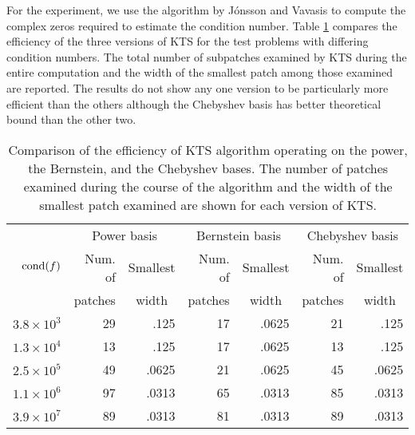 \documentclass[12pt]{article}
\begin{document}
For the experiment, we use the algorithm by J\'{o}nsson and
Vavasis \cite{jonsson} to compute the complex zeros required to
estimate the condition number. Table \ref{table_ba} compares the
efficiency of the three versions of KTS for the test problems
with differing condition numbers. The total number of subpatches
examined by KTS during the entire computation and the width of
the smallest patch among those examined are reported. The results
do not show any one version to be particularly more efficient than
the others although the Chebyshev basis has better theoretical
bound than the other two.
\begin{table}
\caption{Comparison of the efficiency of KTS algorithm
operating on the power, the Bernstein, and the Chebyshev bases.
The number of patches examined during the course of the algorithm
and the width of the smallest patch examined are shown for each
version of KTS. \label{table_ba} }
\begin{center}
\begin{tabular}{|r|r|r|r|r|r|r|}
\hline
 & \multicolumn{2}{c}{Power basis} \vline& \multicolumn{2}{c}{Bernstein basis}\vline & \multicolumn{2}{c}{Chebyshev basis}\vline\\
\cline{2-7}
$\mathop{\rm{cond}}(f)$ & Num. of & Smallest & Num. of & Smallest & Num. of & Smallest\\
& \multicolumn{1}{c}{patches}\vline &
\multicolumn{1}{c}{width}\vline &
\multicolumn{1}{c}{patches}\vline &
\multicolumn{1}{c}{width}\vline
& \multicolumn{1}{c}{patches}\vline & \multicolumn{1}{c}{width}\vline\\
\hline \hline
$3.8 \times 10^3$ & 29 & .125 & 17 & .0625 & 21 & .125 \\
$1.3 \times 10^4$ & 13 & .125 & 17 & .0625 & 13 & .125 \\
$2.5 \times 10^5$ & 49 & .0625 & 21 & .0625 & 45 & .0625 \\
$1.1 \times 10^6$ & 97 & .0313 & 65 & .0313 & 85 & .0313 \\
$3.9 \times 10^7$ & 89 & .0313 & 81 & .0313 & 89 & .0313 \\
\hline
\end{tabular}
\end{center}
\end{table}
\end{document}
